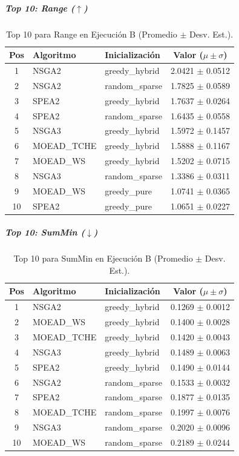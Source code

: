 \subparagraph{Top 10: Range ($\uparrow$)}
\begin{table}[H]
    \centering
    \begin{tabular}{cllc}
        \toprule
        Pos & Algoritmo & Inicialización & Valor ($\mu \pm \sigma$) \\
        \midrule
        1 & NSGA2 & greedy\_hybrid & 2.0421 $\pm$ 0.0512 \\
        2 & NSGA2 & random\_sparse & 1.7825 $\pm$ 0.0589 \\
        3 & SPEA2 & greedy\_hybrid & 1.7637 $\pm$ 0.0264 \\
        4 & SPEA2 & random\_sparse & 1.6435 $\pm$ 0.0558 \\
        5 & NSGA3 & greedy\_hybrid & 1.5972 $\pm$ 0.1457 \\
        6 & MOEAD\_TCHE & greedy\_hybrid & 1.5888 $\pm$ 0.1167 \\
        7 & MOEAD\_WS & greedy\_hybrid & 1.5202 $\pm$ 0.0715 \\
        8 & NSGA3 & random\_sparse & 1.3386 $\pm$ 0.0311 \\
        9 & MOEAD\_WS & greedy\_pure & 1.0741 $\pm$ 0.0365 \\
        10 & SPEA2 & greedy\_pure & 1.0651 $\pm$ 0.0227 \\
        \bottomrule
    \end{tabular}
    \caption{Top 10 para Range en Ejecución B (Promedio $\pm$ Desv. Est.).}
\end{table}

\subparagraph{Top 10: SumMin ($\downarrow$)}
\begin{table}[H]
    \centering
    \begin{tabular}{cllc}
        \toprule
        Pos & Algoritmo & Inicialización & Valor ($\mu \pm \sigma$) \\
        \midrule
        1 & NSGA2 & greedy\_hybrid & 0.1269 $\pm$ 0.0012 \\
        2 & MOEAD\_WS & greedy\_hybrid & 0.1400 $\pm$ 0.0028 \\
        3 & MOEAD\_TCHE & greedy\_hybrid & 0.1420 $\pm$ 0.0043 \\
        4 & NSGA3 & greedy\_hybrid & 0.1489 $\pm$ 0.0063 \\
        5 & SPEA2 & greedy\_hybrid & 0.1490 $\pm$ 0.0144 \\
        6 & NSGA2 & random\_sparse & 0.1533 $\pm$ 0.0032 \\
        7 & SPEA2 & random\_sparse & 0.1877 $\pm$ 0.0135 \\
        8 & MOEAD\_TCHE & random\_sparse & 0.1997 $\pm$ 0.0076 \\
        9 & NSGA3 & random\_sparse & 0.2020 $\pm$ 0.0096 \\
        10 & MOEAD\_WS & random\_sparse & 0.2189 $\pm$ 0.0244 \\
        \bottomrule
    \end{tabular}
    \caption{Top 10 para SumMin en Ejecución B (Promedio $\pm$ Desv. Est.).}
\end{table}

